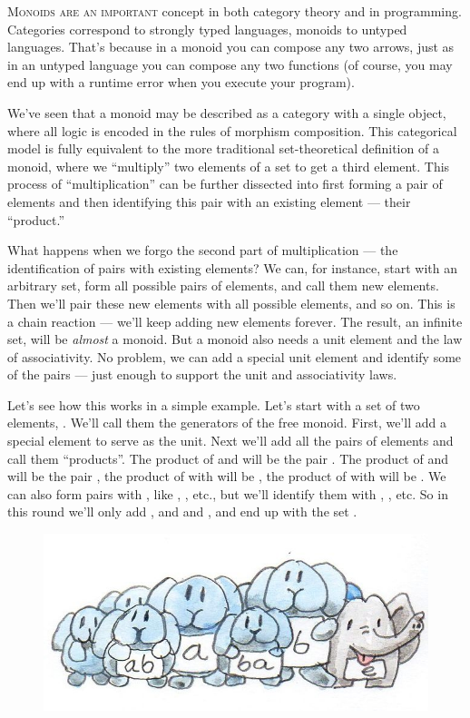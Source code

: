 \lettrine[lhang=0.17]{M}{onoids are an important} concept in both category theory and in
programming. Categories correspond to strongly typed languages, monoids
to untyped languages. That's because in a monoid you can compose any two
arrows, just as in an untyped language you can compose any two functions
(of course, you may end up with a runtime error when you execute your
program).

We've seen that a monoid may be described as a category with a single
object, where all logic is encoded in the rules of morphism composition.
This categorical model is fully equivalent to the more traditional
set-theoretical definition of a monoid, where we ``multiply'' two
elements of a set to get a third element. This process of
``multiplication'' can be further dissected into first forming a pair of
elements and then identifying this pair with an existing element ---
their ``product.''

What happens when we forgo the second part of multiplication --- the
identification of pairs with existing elements? We can, for instance,
start with an arbitrary set, form all possible pairs of elements, and
call them new elements. Then we'll pair these new elements with all
possible elements, and so on. This is a chain reaction --- we'll keep
adding new elements forever. The result, an infinite set, will be
\emph{almost} a monoid. But a monoid also needs a unit element and the
law of associativity. No problem, we can add a special unit element and
identify some of the pairs --- just enough to support the unit and
associativity laws.

Let's see how this works in a simple example. Let's start with a set of
two elements, . We'll call them the generators of the
free monoid. First, we'll add a special element  to serve as
the unit. Next we'll add all the pairs of elements and call them
``products''. The product of  and  will be the pair
. The product of  and  will be the
pair , the product of  with  will be
, the product of  with  will be
. We can also form pairs with , like
, , etc., but we'll identify them with
, , etc. So in this round we'll only add
,  and  and
, and end up with the set
.

\begin{figure}[H]
\centering
\includegraphics[width=\textwidth]{images/bunnies.jpg}
\end{figure}

